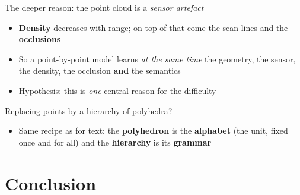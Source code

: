 \documentclass[A4,svgnames,9pt,aspectratio=169]{beamer}
\begin{document}
\begin{frame}{The deeper reason: the point cloud is a \emph{sensor artefact}}
    \begin{center}
        \resizebox{0.72\textwidth}{!}{}
    \end{center}

    \vspace{0.15cm}
    \small
    \begin{itemize}
        \setlength{\itemsep}{5pt}
        \item \textbf{Density} decreases with range; on top of that come the scan lines
        and the \textbf{occlusions}
        \item So a point-by-point model learns \emph{at the same time} the geometry,
        the sensor, the density, the occlusion \textbf{and} the semantics
        \item Hypothesis: this is \emph{one} central reason for the difficulty
    \end{itemize}
\end{frame}

\begin{frame}{Replacing points by a hierarchy of \textcolor{inria-rouge}{polyhedra}?}
    \vspace{-0.10cm}
    \begin{center}
        \resizebox{0.54\textwidth}{!}{}
    \end{center}

    \vspace{0.26cm}
    \small
    \begin{itemize}
        \item Same recipe as for text: the \textbf{polyhedron} is the \textbf{alphabet}
        (the unit, fixed once and for all) and the \textbf{hierarchy} is its
        \textbf{grammar}
    \end{itemize}
\end{frame}

\section{Conclusion}
\frame{\sectionpage}
\end{document}
